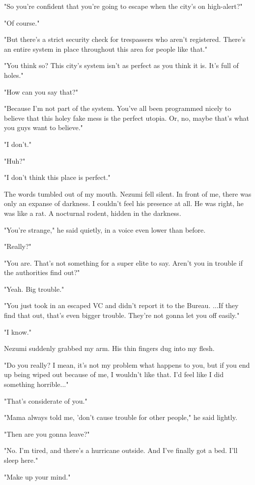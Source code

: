 "So you're confident that you're going to escape when the city's on
high-alert?"

"Of course."

"But there's a strict security check for trespassers who aren't
registered. There's an entire system in place throughout this area for
people like that."

"You think so? This city's system isn't as perfect as you think it is.
It's full of holes."

"How can you say that?"

"Because I'm not part of the system. You've all been programmed nicely
to believe that this holey fake mess is the perfect utopia. Or, no,
maybe that's what you guys want to believe."

"I don't."

"Huh?"

"I don't think this place is perfect."

The words tumbled out of my mouth. Nezumi fell silent. In front of me,
there was only an expanse of darkness. I couldn't feel his presence at
all. He was right, he was like a rat. A nocturnal rodent, hidden in the
darkness.

"You're strange," he said quietly, in a voice even lower than before.

"Really?"

"You are. That's not something for a super elite to say. Aren't you in
trouble if the authorities find out?"

"Yeah. Big trouble."

"You just took in an escaped VC and didn't report it to the Bureau.
...If they find that out, that's even bigger trouble. They're not gonna
let you off easily."

"I know."

Nezumi suddenly grabbed my arm. His thin fingers dug into my flesh.

"Do you really? I mean, it's not my problem what happens to you, but if
you end up being wiped out because of me, I wouldn't like that. I'd feel
like I did something horrible..."

"That's considerate of you."

"Mama always told me, 'don't cause trouble for other people," he said
lightly.

"Then are you gonna leave?"

"No. I'm tired, and there's a hurricane outside. And I've finally got a
bed. I'll sleep here."

"Make up your mind."

